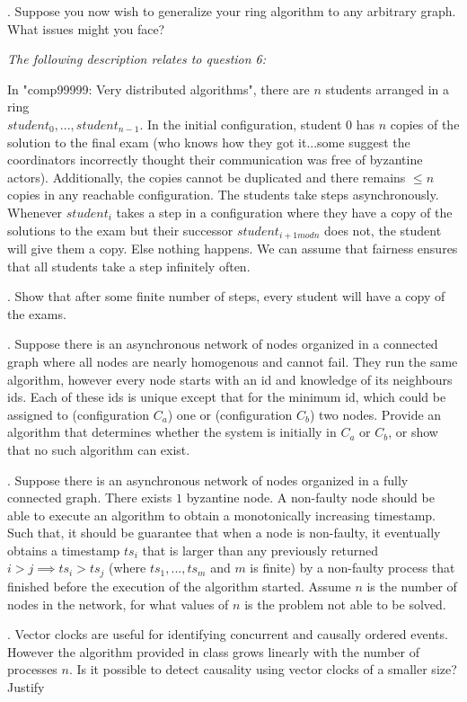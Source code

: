 \documentclass[parskip=full+, paper=a4, fontsize=12pt, ]{scrartcl}
\newcounter{question}
\newcommand{\question}[1]{
    \stepcounter{question}
    \thequestion. #1 \hfill
}
\begin{document}
\question{Suppose you now wish to generalize your ring algorithm to any arbitrary graph. What issues might you face?}


\textit{The following description relates to question 6:}


In "comp99999: Very distributed algorithms", there are $n$ students arranged in a ring \\$student_0,...,student_{n-1}$. In the initial configuration, student $0$ has $n$ copies of the solution to the final exam (who knows how they got it...some suggest the coordinators incorrectly thought their communication was free of byzantine actors). Additionally, the copies cannot be duplicated and there remains $\leq n$ copies in any reachable configuration. The students take steps asynchronously. Whenever $student_i$ takes a step in a configuration where they have a copy of the solutions to the exam but their successor $student_{i+1 mod n}$ does not, the student will give them a copy. Else nothing happens. We can assume that fairness ensures that all students take a step infinitely often.


\question{Show that after some finite number of steps, every student will have a copy of the exams.}


\question{Suppose there is an asynchronous network of nodes organized in a connected graph where all nodes are nearly homogenous and cannot fail. They run the same algorithm, however every node starts with an id and knowledge of its neighbours ids. Each of these ids is unique except that for the minimum id, which could be assigned to (configuration $C_a$) one or (configuration $C_b$) two nodes. Provide an algorithm that determines whether the system is initially in $C_a$ or $C_b$, or show that no such algorithm can exist.}



\question{Suppose there is an asynchronous network of nodes organized in a fully connected graph. There exists $1$ byzantine node. A non-faulty node should be able to execute an algorithm to obtain a monotonically increasing timestamp. Such that, it should be guarantee that when a node is non-faulty, it eventually obtains a timestamp $ts_i$ that is larger than any previously returned $i > j \implies ts_i > ts_j$ (where $ts_1,...,ts_m$ and $m$ is finite) by a non-faulty process that finished before the execution of the algorithm started. Assume $n$ is the number of nodes in the network, for what values of $n$ is the problem not able to be solved.}


\question{Vector clocks are useful for identifying concurrent and causally ordered events. However the algorithm provided in class grows linearly with the number of processes $n$. Is it possible to detect causality using vector clocks of a smaller size? Justify}
\end{document}
